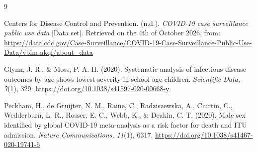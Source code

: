 \documentclass{article}
\begin{document}
\onecolumn
\newpage
\begin{thebibliography}{9}

Centers for Disease Control and Prevention. (n.d.). \textit{COVID-19 case surveillance public use data} [Data set]. Retrieved on the 4th of October 2026, from:
\href{https://data.cdc.gov/Case-Surveillance/COVID-19-Case-Surveillance-Public-Use-Data/vbim-akqf/about_data}{https://data.cdc.gov/Case-Surveillance/COVID-19-Case-Surveillance-Public-Use-Data/vbim-akqf/about\_data}

Glynn, J. R., \& Moss, P. A. H. (2020). Systematic analysis of infectious disease outcomes by age shows lowest severity in school-age children. \textit{Scientific Data, 7}(1), 329. 
\href{https://doi.org/10.1038/s41597-020-00668-y}{https://doi.org/10.1038/s41597-020-00668-y}

Peckham, H., de Gruijter, N. M., Raine, C., Radziszewska, A., Ciurtin, C., Wedderburn, L. R., Rosser, E. C., Webb, K., \& Deakin, C. T. (2020). Male sex identified by global COVID-19 meta-analysis as a risk factor for death and ITU admission. \textit{Nature Communications, 11}(1), 6317.
\href{https://doi.org/10.1038/s41467-020-19741-6}{https://doi.org/10.1038/s41467-020-19741-6}

\end{thebibliography}
\end{document}

